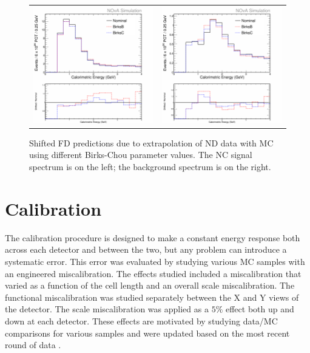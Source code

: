 \begin{figure}[htb]
  \centering
  \begin{tabular}{c c}
    \includegraphics[width=.47\textwidth]{figures/Systs/cNCEXBirksSysts.png} &
    \includegraphics[width=.47\linewidth]{figures/Systs/cBGEXBirksSysts.png} \\
  \end{tabular}
  \caption[Birks-Chou Shifted FD Predictions]{Shifted FD predictions due to extrapolation of ND data with MC using different Birks-Chou parameter values. The NC signal spectrum is on the left; the background spectrum is on the right.}
  \label{fig:SystBirks}
\end{figure}

\section{Calibration}
\label{sec:SystCalib}

The calibration procedure is designed to make a constant energy response both across each detector and between the two, but any problem can introduce a systematic error. This error was evaluated by studying various MC samples with an engineered miscalibration. The effects studied included a miscalibration that varied as a function of the cell length and an overall scale miscalibration. The functional miscalibration was studied separately between the X and Y views of the detector. The scale miscalibration was applied as a $5\%$ effect both up and down at each detector. These effects are motivated by studying data/MC comparisons for various samples \cite{ref:TNCalib, ref:CalibMESA, ref:CalibPi0SA} and were updated based on the most recent round of data \cite{ref:CalibSA}.

